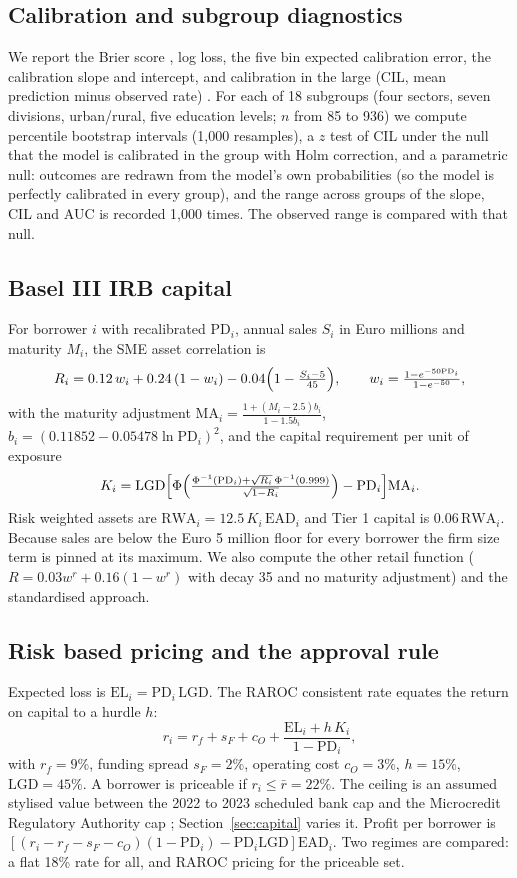 \documentclass[11pt,a4paper]{article}
\newcommand{\PD}{\ensuremath{\mathrm{PD}}}
\newcommand{\LGD}{\ensuremath{\mathrm{LGD}}}
\newcommand{\EAD}{\ensuremath{\mathrm{EAD}}}
\newcommand{\RWA}{\ensuremath{\mathrm{RWA}}}
\newcommand{\EL}{\ensuremath{\mathrm{EL}}}
\begin{document}
\subsection{Calibration and subgroup diagnostics}
We report the Brier score \citep{Brier1950}, log loss, the five bin expected calibration error, the calibration slope and intercept, and calibration in the large (CIL, mean prediction minus observed rate) \citep{Steyerberg2010}. For each of 18 subgroups (four sectors, seven divisions, urban/rural, five education levels; $n$ from 85 to 936) we compute percentile bootstrap intervals (1{,}000 resamples), a $z$ test of CIL under the null that the model is calibrated in the group with Holm correction, and a parametric null: outcomes are redrawn from the model's own probabilities (so the model is perfectly calibrated in every group), and the range across groups of the slope, CIL and AUC is recorded 1{,}000 times. The observed range is compared with that null.

\subsection{Basel III IRB capital}
For borrower $i$ with recalibrated $\PD_i$, annual sales $S_i$ in Euro millions and maturity $M_i$, the SME asset correlation is
\begin{equation}
R_i = 0.12\,w_i + 0.24\,(1-w_i) - 0.04\Bigl(1-\tfrac{S_i-5}{45}\Bigr),\qquad w_i=\tfrac{1-e^{-50\PD_i}}{1-e^{-50}},
\end{equation}
with the maturity adjustment $\mathrm{MA}_i=\frac{1+(M_i-2.5)b_i}{1-1.5b_i}$, $b_i=(0.11852-0.05478\ln\PD_i)^2$, and the capital requirement per unit of exposure
\begin{equation}
K_i=\LGD\Bigl[\Phi\Bigl(\tfrac{\Phi^{-1}(\PD_i)+\sqrt{R_i}\,\Phi^{-1}(0.999)}{\sqrt{1-R_i}}\Bigr)-\PD_i\Bigr]\mathrm{MA}_i .
\end{equation}
Risk weighted assets are $\RWA_i=12.5\,K_i\,\EAD_i$ and Tier 1 capital is $0.06\,\RWA_i$. Because sales are below the Euro 5 million floor for every borrower the firm size term is pinned at its maximum. We also compute the other retail function ($R=0.03w^{r}+0.16(1-w^{r})$ with decay 35 and no maturity adjustment) and the standardised approach.

\subsection{Risk based pricing and the approval rule}
Expected loss is $\EL_i=\PD_i\,\LGD$. The RAROC consistent rate equates the return on capital to a hurdle $h$:
\begin{equation}
r_i = r_f+s_F+c_O+\frac{\EL_i+h\,K_i}{1-\PD_i},
\end{equation}
with $r_f=9\%$, funding spread $s_F=2\%$, operating cost $c_O=3\%$, $h=15\%$, $\LGD=45\%$. A borrower is priceable if $r_i\le\bar r=22\%$. The ceiling is an assumed stylised value between the 2022 to 2023 scheduled bank cap and the Microcredit Regulatory Authority cap \citep{BangladeshBank2024,BangladeshBank2020}; Section~\ref{sec:capital} varies it. Profit per borrower is $[(r_i-r_f-s_F-c_O)(1-\PD_i)-\PD_i\LGD]\EAD_i$. Two regimes are compared: a flat 18\% rate for all, and RAROC pricing for the priceable set.
\end{document}
